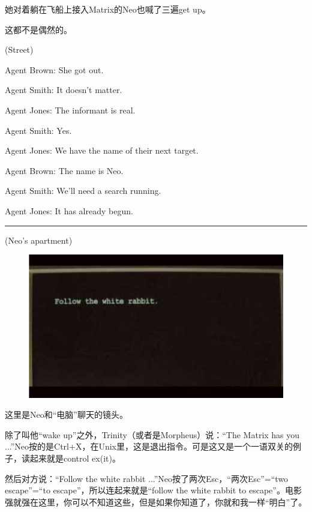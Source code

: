 \documentclass[UTF8]{ctexart}
\newcommand{\myparsep}{\noindent \rule[0.5ex]{\linewidth}{1pt}}
\newenvironment{myquote}{\color{green} \setlength{\leftskip}{6em} \setlength{\rightskip}{4em} \setlength{\parindent}{-2em}}{\par}
\begin{document}
她对着躺在飞船上接入Matrix的Neo也喊了三遍get up。

这都不是偶然的。

\begin{myquote}
(Street)

Agent Brown: She got out.

Agent Smith: It doesn't matter.

Agent Jones: The informant is real.

Agent Smith: Yes.

Agent Jones: We have the name of their next target.

Agent Brown: The name is Neo.

Agent Smith: We'll need a search running.

Agent Jones: It has already begun.
\end{myquote}

\myparsep

\begin{myquote}
(Neo's apartment)
\end{myquote}

\begin{figure}[htb]
\centering
\includegraphics[width=0.5\linewidth]{fig/read_Matrix-3}
\end{figure}

这里是Neo和“电脑”聊天的镜头。

除了叫他“wake up”之外，Trinity（或者是Morpheus）说：“The Matrix has you ...”Neo按的是Ctrl+X，在Unix里，这是退出指令。可是这又是一个一语双关的例子，读起来就是control ex(it)。

然后对方说：“Follow the white rabbit ...”Neo按了两次Esc，“两次Esc”=“two escape”=“to escape”，所以连起来就是“follow the white rabbit to escape”。电影强就强在这里，你可以不知道这些，但是如果你知道了，你就和我一样“明白”了。
\end{document}
